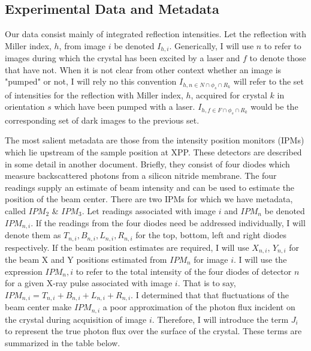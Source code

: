 \documentclass{report}
\begin{document}
\subsection{Experimental Data and Metadata}
Our data consist mainly of integrated reflection intensities. 
Let the reflection with Miller index, $h$, from image $i$ be denoted $I_{h,i}$. 
Generically, I will use $n$ to refer to images during which the crystal has been excited by a laser and $f$ to denote those that have not. 
When it is not clear from other context whether an image is "pumped" or not, I will rely no this convention
$I_{h,n \in N \cap \phi_s \cap R_k}$ will refer to the set of intensities for the reflection with Miller index, $h$, acquired for crystal $k$ in orientation $s$ which have been pumped with a laser. 
$I_{h,f \in F \cap \phi_s \cap R_k}$ would be the corresponding set of dark images to the previous set.

The most salient metadata are those from the intensity position monitors (IPMs) which lie upstream of the sample position at XPP. 
These detectors are described in some detail in another document. 
Briefly, they consist of four diodes which measure backscattered photons from a silicon nitride membrane.
The four readings supply an estimate of beam intensity and can be used to estimate the position of the beam center. 
There are two IPMs for which we have metadata, called $IPM_2$ \& $IPM_3$. 
Let readings associated with image $i$ and $IPM_n$ be denoted $IPM_{n,i}$.
If the readings from the four diodes need be addressed individually, I will denote them as $T_{n, i}, B_{n, i}, L_{n, i}, R_{n, i}$ for the top, bottom, left and right diodes respectively. 
If the beam position estimates are required, I will use $X_{n,i}$, $Y_{n,i}$ for the beam X and Y positions estimated from $IPM_n$ for image $i$. 
I will use the expression $IPM_n,i$ to refer to the total intensity of the four diodes of detector $n$ for a given X-ray pulse associated with image $i$. 
That is to say, $IPM_{n,i} = T_{n,i}+B_{n,i}+L_{n,i}+R_{n,i}$.
I determined that that fluctuations of the beam center make $IPM_{n,i}$ a poor approximation of the photon flux incident on the crystal during acquisition of image $i$. 
Therefore, I will introduce the term $J_i$ to represent the true photon flux over the surface of the crystal. 
These terms are summarized in the table below.
\end{document}
